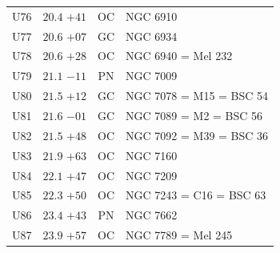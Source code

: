 \begin{table}[t]
\begin{tabularx}{\linewidth}{lccX}
U76  &$20.4$ $+41$&OC &NGC 6910\\
U77  &$20.6$ $+07$&GC &NGC 6934\\
U78  &$20.6$ $+28$&OC &NGC 6940 = Mel 232\\
U79  &$21.1$ $-11$&PN &NGC 7009\\
U80  &$21.5$ $+12$&GC &NGC 7078 = M15 = BSC 54\\
U81  &$21.6$ $-01$&GC &NGC 7089 = M2 = BSC 56\\
U82  &$21.5$ $+48$&OC &NGC 7092 = M39 = BSC 36\\
U83  &$21.9$ $+63$&OC &NGC 7160\\
U84  &$22.1$ $+47$&OC &NGC 7209\\
U85  &$22.3$ $+50$&OC &NGC 7243 = C16 = BSC 63\\
U86  &$23.4$ $+43$&PN &NGC 7662\\
U87  &$23.9$ $+57$&OC &NGC 7789 = Mel 245\\

        \hline
    \end{tabularx}
\end{table}
\clearpage

